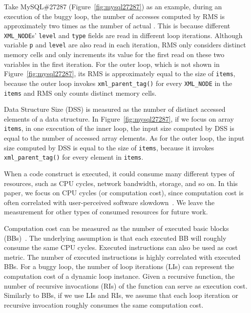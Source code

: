 Take MySQL\#27287 (Figure~\ref{fig:mysql27287}) as an example, 
during an execution of the buggy loop, the number of accesses
computed by RMS is approximately 
two times as the number of actual . 
This is because different \texttt{XML\_NODE}s' \texttt{level} and \texttt{type} 
fields are read in different loop iterations. 
Although variable \texttt{p} and \texttt{level} are also read in each iteration,
RMS only considers distinct memory cells and 
only increments its value for the first read on these 
two variables in the first iteration. 
For the outer loop, which is not shown in Figure~\ref{fig:mysql27287}, 
its RMS is approximately equal to the size of \texttt{items}, 
because the outer loop invokes \texttt{xml\_parent\_tag()} for every
\texttt{XML\_NODE} in the \texttt{items} and RMS only 
counts distinct memory cells. 


Data Structure Size (DSS) is measured as
the number of distinct accessed elements of a data structure.  
%
In Figure~\ref{fig:mysql27287}, if we focus on array \texttt{items},
in one execution of the inner loop, the input size computed by DSS 
is equal to the number of accessed array elements. 
As for the outer loop, the input size computed by DSS  is
equal to the size of  \texttt{items}, because
it invokes \texttt{xml\_parent\_tag()} for every element in \texttt{items}.


When a code construct is executed,
it could consume many different types of resources, 
such as CPU cycles, network bandwidth, storage, and so on.
In this paper, we focus on CPU cycles (or computation cost), 
since computation cost is often correlated 
with user-perceived software slowdown~\cite{SongOOPSLA2014}.
We leave the measurement for other types of 
consumed resources for future work.


Computation cost can be measured 
as the number of executed basic blocks (BBs)~\cite{Aprof1,Aprof2}.
The underlying assumption is that each executed 
BB will roughly consume the same CPU cycles. 
Executed instructions can also be used as cost metric. 
The number of executed instructions is highly correlated with executed BBs.
For a buggy loop, the number of loop iterations (LIs) can represent 
the computation cost of a dynamic loop instance.
Given a recursive function, the number of recursive invocations (RIs) 
of the function can serve as execution cost.
Similarly to BBs, if we use LIs and RIs, 
we assume that each loop iteration or recursive invocation 
roughly consumes the same computation cost. 



